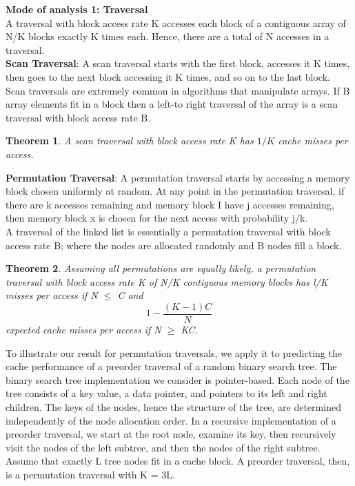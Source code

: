 \documentclass[14pt]{article}
\newtheorem{theorem}{Theorem}
\begin{document}
\textbf{Mode of analysis 1: Traversal}\\
A traversal with block access rate K accesses each block of a contiguous array of N/K blocks exactly K times each. Hence, there are a total of N accesses in a traversal. \\

\textbf{Scan Traversal}: A scan traversal starts with the first block, accesses it K times, then goes to the next block accessing it K times, and so on to the last block. Scan traversals are extremely common in algorithms that manipulate arrays. If B array elements fit in a block then a left-to right traversal of the array is a scan traversal with block access rate B.
\begin{theorem}
A scan traversal with block access rate K has $1/K$ cache misses per access.
\end{theorem} \textbf{Permutation Traversal}: A permutation traversal starts by accessing a memory block chosen uniformly at random. At any point in the permutation traversal, if there are k accesses remaining and memory block I have j accesses remaining, then memory block x is chosen for the next access with probability j/k. \\
A traversal of the linked list is essentially a permutation traversal with block access rate B; where the nodes are allocated randomly and B nodes fill a block.
\begin{theorem}
Assuming all permutations are equally likely, a permutation traversal with block access rate K of N/K contiguous memory blocks has l/K misses per access if  N $\leq$ C and  \[ 1 - \dfrac{(K-1)C}{N}  \] expected cache misses per access if N $\geq$ KC. 

\end{theorem}

To illustrate our result for permutation traversals, we apply it to predicting the cache performance of a preorder traversal of a random binary search tree. The binary search tree implementation we consider is pointer-based. Each node of the tree consists of a key value, a data pointer, and pointers to its left and right children. The keys of the nodes, hence the structure of the tree, are determined independently of the node allocation order. In a recursive implementation of a preorder traversal, we start at the root node, examine its key, then recursively visit the nodes of the left subtree, and then the nodes of the right subtree. Assume that exactly L tree nodes fit in a cache block. A preorder traversal, then, is a permutation traversal with K = 3L.
  
\end{document}
